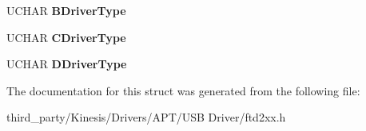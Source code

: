 \begin{DoxyCompactItemize}
\item 
U\+C\+H\+AR {\bfseries B\+Driver\+Type}\hypertarget{structft__eeprom__4232h_a6a5cbfcb0e59bd89ed6338f44f8c5b5c}{}\label{structft__eeprom__4232h_a6a5cbfcb0e59bd89ed6338f44f8c5b5c}

\item 
U\+C\+H\+AR {\bfseries C\+Driver\+Type}\hypertarget{structft__eeprom__4232h_af1da86c7d0ff4bb811627c5d84c5ce79}{}\label{structft__eeprom__4232h_af1da86c7d0ff4bb811627c5d84c5ce79}

\item 
U\+C\+H\+AR {\bfseries D\+Driver\+Type}\hypertarget{structft__eeprom__4232h_a686ad080f8c280b2ca149233f584fb29}{}\label{structft__eeprom__4232h_a686ad080f8c280b2ca149233f584fb29}

\end{DoxyCompactItemize}


The documentation for this struct was generated from the following file\+:\begin{DoxyCompactItemize}
\item 
third\+\_\+party/\+Kinesis/\+Drivers/\+A\+P\+T/\+U\+S\+B Driver/ftd2xx.\+h\end{DoxyCompactItemize}
